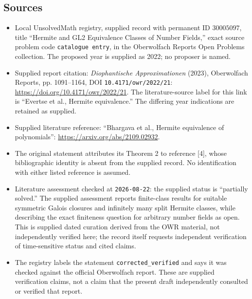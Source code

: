 \documentclass[11pt]{article}
\begin{document}
\subsection{Sources}
\begin{itemize}
\item Local UnsolvedMath registry, supplied record with permanent ID \(30005097\), title ``Hermite and GL2 Equivalence Classes of Number Fields,'' exact source problem code \texttt{catalogue entry}, in the Oberwolfach Reports Open Problems collection. The proposed year is supplied as 2022; no proposer is named.
\item Supplied report citation: \emph{Diophantische Approximationen} (2023), Oberwolfach Reports, pp. 1091--1164, DOI \texttt{10.4171/owr/2022/21}: \url{https://doi.org/10.4171/owr/2022/21}. The literature-source label for this link is ``Evertse et al., Hermite equivalence.'' The differing year indications are retained as supplied.
\item Supplied literature reference: ``Bhargava et al., Hermite equivalence of polynomials'': \url{https://arxiv.org/abs/2109.02932}.
\item The original statement attributes its Theorem 2 to reference [4], whose bibliographic identity is absent from the supplied record. No identification with either listed reference is assumed.
\item Literature assessment checked at \texttt{2026-08-22}: the supplied status is ``partially solved.'' The supplied assessment reports finite-class results for suitable symmetric Galois closures and infinitely many split Hermite classes, while describing the exact finiteness question for arbitrary number fields as open. This is supplied dated curation derived from the OWR material, not independently verified here; the record itself requests independent verification of time-sensitive status and cited claims.
\item The registry labels the statement \texttt{corrected\_verified} and says it was checked against the official Oberwolfach report. These are supplied verification claims, not a claim that the present draft independently consulted or verified that report.
\end{itemize}
\end{document}
